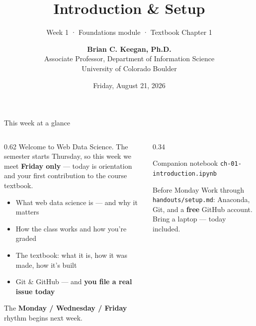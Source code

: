 \documentclass[9pt,aspectratio=169]{beamer}
\title[Week 1 · Introduction]{{\Huge Introduction \& Setup}}
\subtitle{Week 1 · Foundations module · Textbook Chapter 1}
\author[Keegan]{\textbf{Brian C. Keegan, Ph.D.} \\ Associate Professor, Department of Information Science \\ University of Colorado Boulder}
\date{Friday, August 21, 2026}
\begin{document}
\maketitle

\begin{frame}{This week at a glance}
    \begin{columns}[T]
        \begin{column}{0.62\textwidth}
            Welcome to Web Data Science. The semester starts Thursday, so this week we meet \textbf{Friday only} --- today is orientation and your first contribution to the course textbook.

            \vspace{1em}

            \begin{itemize}\small
                \item What web data science is --- and why it matters
                \item How the class works and how you're graded
                \item The textbook: what it is, how it was made, how it's built
                \item Git \& GitHub --- and \textbf{you file a real issue today}
            \end{itemize}

            \vspace{0.75em}

            The \textbf{Monday / Wednesday / Friday} rhythm begins next week.
        \end{column}
        \begin{column}{0.34\textwidth}
            \begin{block}{Companion notebook}
                \footnotesize \texttt{ch-01-introduction.ipynb}
            \end{block}
            \begin{alertblock}{Before Monday}
                \footnotesize Work through \texttt{handouts/setup.md}: Anaconda, Git, and a \textbf{free} GitHub account. Bring a laptop --- today included.
            \end{alertblock}
        \end{column}
    \end{columns}
\end{frame}
\end{document}

